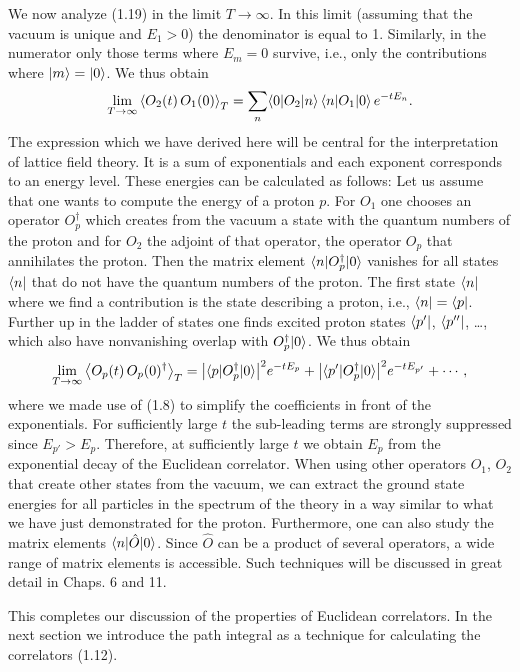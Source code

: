 We now analyze (1.19) in the limit $T \to \infty$. In this limit (assuming
that the vacuum is unique and $E_1 > 0$) the denominator is equal to 1.
Similarly, in the numerator only those terms where $E_m = 0$ survive, i.e.,
only the contributions where $|m\rangle = |0\rangle$. We thus obtain
\begin{equation}
  \lim_{T\to\infty}\left\langle O_2(t)\,O_1(0) \right\rangle_T
  = \sum_n \langle0|O_2|n\rangle\,\langle n|O_1|0\rangle\,e^{-tE_n}.
\end{equation}
The expression which we have derived here will be central for the
interpretation of lattice field theory. It is a sum of exponentials and each
exponent corresponds to an energy level. These energies can be calculated as
follows: Let us assume that one wants to compute the energy of a proton $p$.
For $O_1$ one chooses an operator $O_p^\dagger$ which creates from the vacuum a
state with the quantum numbers of the proton and for $O_2$ the adjoint of that
operator, the operator $O_p$ that annihilates the proton. Then the matrix
element $\langle n|O_p^\dagger|0\rangle$ vanishes for all states $\langle n|$ that do
not have the quantum numbers of the proton. The first state $\langle n|$ where we
find a contribution is the state describing a proton, i.e., $\langle n| = \langle p|$.
Further up in the ladder of states one finds excited proton states $\langle p'|$,
$\langle p''|$, \dots, which also have nonvanishing overlap with
$O_p^\dagger|0\rangle$. We thus obtain
\begin{equation}
  \lim_{T\to\infty}\left\langle O_p(t)\,O_p(0)^\dagger \right\rangle_T
  = \big|\langle p|O_p^\dagger|0\rangle\big|^2 e^{-tE_p}
    + \big|\langle p'|O_p^\dagger|0\rangle\big|^2 e^{-tE_{p'}} + \cdots,
\end{equation}
where we made use of (1.8) to simplify the coefficients in front of the
exponentials. For sufficiently large $t$ the sub-leading terms are strongly
suppressed since $E_{p'} > E_p$. Therefore, at sufficiently large $t$ we obtain
$E_p$ from the exponential decay of the Euclidean correlator. When using other
operators $O_1$, $O_2$ that create other states from the vacuum, we can extract
the ground state energies for all particles in the spectrum of the theory in a
way similar to what we have just demonstrated for the proton. Furthermore, one
can also study the matrix elements $\langle n|\hat{O}|0\rangle$. Since $\hat{O}$ can
be a product of several operators, a wide range of matrix elements is
accessible. Such techniques will be discussed in great detail in Chaps. 6
and 11.

This completes our discussion of the properties of Euclidean correlators. In
the next section we introduce the path integral as a technique for calculating
the correlators (1.12).

